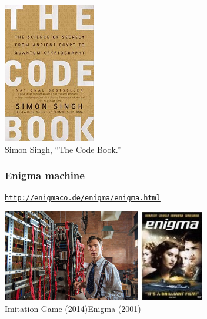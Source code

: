\begin{frame}
\begin{center}
\includegraphics[width=4cm]{Figures/singh.jpeg} \\
Simon Singh, ``The Code Book.''
\end{center}
\end{frame}

\begin{frame}
\frametitle{Enigma machine}

\href{http://enigmaco.de/enigma/enigma.html}%
{\tt http://enigmaco.de/enigma/enigma.html}

\end{frame}

\begin{frame}
\begin{center}
\includegraphics[height=4cm]{Figures/Imitation.jpg}
\hfill
\includegraphics[height=4cm]{Figures/Enigma.jpg} \\
Imitation Game (2014)\hfill Enigma (2001)
\end{center}
\end{frame}

